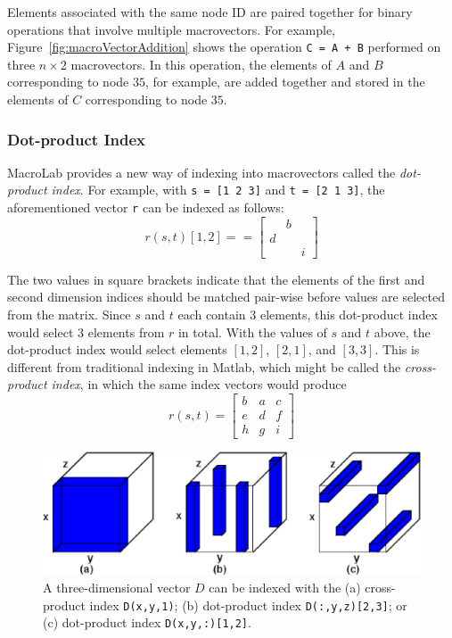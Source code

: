 Elements associated with the same node ID are paired together for binary
operations that involve multiple macrovectors.  For example,
Figure~\ref{fig:macroVectorAddition} shows the operation {\tt C = A + B}
performed on three $n \times 2$ macrovectors. In this operation, the elements of
$A$ and $B$ corresponding to node $35$, for example, are added together and
stored in the elements of $C$ corresponding to node $35$.

\subsubsection{Dot-product Index} \label{sect:dotProduct} 

MacroLab provides a new way of indexing into macrovectors called the {\em
dot-product index}.  For example, with {\tt s~=~[1~2~3]} and {\tt t~=~[2~1~3]},
the aforementioned vector {\tt r} can be indexed as follows:
 \[ r(s,t)[1,2] == \left[ \begin{array}{ccc}
  & b &   \\
d &   &   \\
  &   & i \end{array} \right]\]

The two values in square brackets indicate that the elements of the first and
second dimension indices should be matched pair-wise before values are selected
from the matrix.  Since $s$ and $t$ each contain 3 elements, this dot-product
index would select 3 elements from $r$ in total.  With the values of $s$ and $t$
above, the dot-product index would select elements $[1, 2]$, $[2, 1]$, and $[3,
3]$.  This is different from traditional indexing in Matlab, which might be
called the {\em cross-product index}, in which the same index vectors would
produce
\[ r(s,t) = \left[ \begin{array}{ccc}
b & a & c \\
e & d & f \\
h & g & i \end{array} \right]\]

\begin{figure}[t]
  \centering
  \includegraphics[width=0.8\columnwidth]{fig/DotProducts}
  \caption[Example of dot-product indexing]{A three-dimensional vector $D$ can
    be indexed with the (a) cross-product index {\tt D(x,y,1)}; (b) dot-product
    index {\tt D(:,y,z)[2,3]}; or (c) dot-product index {\tt D(x,y,:)[1,2]}.}
  \label{fig:dotProduct}
\end{figure}

